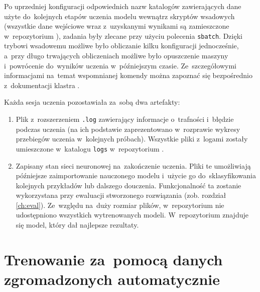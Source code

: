 \documentclass[twoside]{praca}
\begin{document}
Po uprzedniej konfiguracji odpowiednich nazw katalogów zawierających dane użyte do~kolejnych etapów uczenia modelu wewnątrz skryptów wsadowych (wszystkie dane wejściowe wraz z~uzyskanymi wynikami są zamieszczone w~repozytorium \cite{fracz:code-quality-tf}), zadania były zlecane przy użyciu polecenia \texttt{sbatch}. Dzięki trybowi wsadowemu możliwe było obliczanie kilku konfiguracji jednocześnie, a~przy długo trwających obliczeniach możliwe było opuszczenie maszyny i~powrócenie do~wyników uczenia w~późniejszym czasie. Ze~szczegółowymi informacjami na~temat wspomnianej komendy można zapoznać się bezpośrednio z~dokumentacji klastra \cite{cyfronet:prometheus-podstawy}.


Każda sesja uczenia pozostawiała za~sobą dwa artefakty:

\begin{enumerate}
    \item Plik z~rozszerzeniem \texttt{.log} zawierający informacje o~trafności i~błędzie podczas uczenia (na ich podstawie zaprezentowano w~rozprawie wykresy przebiegów uczenia w~kolejnych próbach). Wszystkie pliki z~logami zostały umieszczone w~katalogu \texttt{logs} w~repozytorium \cite{fracz:code-quality-tf}.
    \item Zapisany stan sieci neuronowej na~zakończenie uczenia. Pliki te umożliwiają późniejsze zaimportowanie nauczonego modelu i~użycie go do~sklasyfikowania kolejnych przykładów lub dalszego douczenia. Funkcjonalność ta zostanie wykorzystana przy ewaluacji stworzonego rozwiązania (zob. rozdział \ref{ch:eval}). Ze~względu na~duży rozmiar plików, w~repozytorium nie udostępniono wszystkich wytrenowanych modeli. W~repozytorium \cite{fracz:scqm} znajduje się model, który dał najlepsze rezultaty.
\end{enumerate}

\section{Trenowanie za~pomocą danych zgromadzonych automatycznie}

\end{document}
